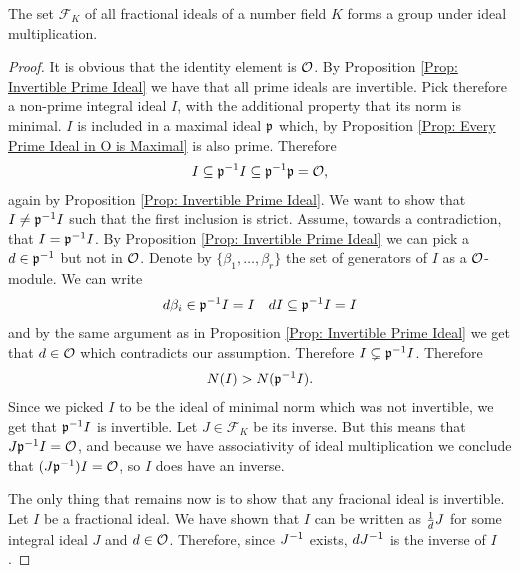     \begin{proposition}
        The set \(\mathcal{F}_K\) of all fractional ideals of a number field \(K\) forms a group under ideal multiplication.
    \end{proposition}
    \begin{proof}
        It is obvious that the identity element is \(\mathcal{O}\). By Proposition \ref{Prop: Invertible Prime Ideal} we have that all prime ideals are invertible. Pick therefore a non-prime integral ideal \(I\), with the additional property that its norm is minimal. \(I\) is included in a maximal ideal \(\mathfrak{p}\) which, by  Proposition \ref{Prop: Every Prime Ideal in O is Maximal} is also prime. Therefore
        \begin{align*}
            I\subseteq \mathfrak{p}^{-1} I \subseteq \mathfrak{p}^{-1}\mathfrak{p} = \mathcal{O},
        \end{align*}
        again by Proposition \ref{Prop: Invertible Prime Ideal}. We want to show that \(I\neq \mathfrak{p}^{-1} I\) such that the first inclusion is strict. Assume, towards a contradiction, that \(I = \mathfrak{p}^{-1} I\). By Proposition \ref{Prop: Invertible Prime Ideal} we can pick a \(d\in\mathfrak{p}^{-1}\) but not in \(\mathcal{O}\). Denote by \(\{\beta_1 ,\dots ,\beta_r \}\) the set of generators of \(I\) as a \(\mathcal{O}\)-module. We can write
        \begin{align*}
            d\beta_i \in\mathfrak{p}^{-1} I = I \quad dI\subseteq \mathfrak{p}^{-1} I = I
        \end{align*}
        and by the same argument as in Proposition \ref{Prop: Invertible Prime Ideal} we get that \(d\in\mathcal{O}\) which contradicts our assumption. Therefore \(I\subsetneq \mathfrak{p}^{-1} I\). Therefore
        \begin{align*}
            N(I) > N(\mathfrak{p}^{-1} I).
        \end{align*}
        Since we picked \(I\) to be the ideal of minimal norm which was not invertible, we get that \(\mathfrak{p}^{-1} I\) is invertible. Let \(J\in\mathcal{F}_K\) be its inverse. But this means that \(J\mathfrak{p}^{-1} I = \mathcal{O}\), and because we have associativity of ideal multiplication we conclude that \((J\mathfrak{p}^{-1} )I = \mathcal{O}\), so \(I\) does have an inverse. \par
        The only thing that remains now is to show that any fracional ideal is invertible. Let \(I\) be a fractional ideal. We have shown  that \(I\) can be written as \(\small\frac{1}{d} J\) for some integral ideal \(J\) and \(d\in\mathcal{O}\). Therefore, since \(J^{-1}\) exists, \(dJ^{-1}\) is the inverse of \(I\).
    \end{proof}
